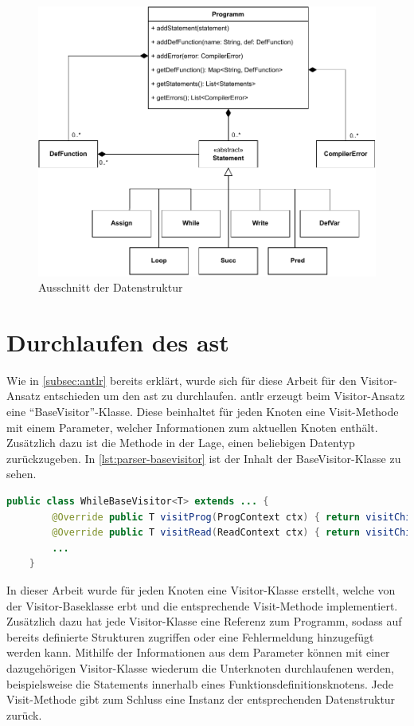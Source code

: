 \begin{figure}[h!]
	\centering
	\includegraphics[width=13cm]{content/pictures/ClassDia.pdf}
	\caption{Ausschnitt der Datenstruktur}
	\label{pic:Semantic-Struct}
\end{figure}

\section{Durchlaufen des \acl{ast}}
Wie in \cref{subsec:antlr} bereits erklärt, wurde sich für diese Arbeit für den Visitor-Ansatz entschieden um den \ac{ast} zu durchlaufen. \ac{antlr} erzeugt beim Visitor-Ansatz eine \enquote{BaseVisitor}-Klasse. Diese beinhaltet für jeden Knoten eine Visit-Methode mit einem Parameter, welcher Informationen zum aktuellen Knoten enthält. Zusätzlich dazu ist die Methode in der Lage, einen beliebigen Datentyp zurückzugeben. In \cref{lst:parser-basevisitor} ist der Inhalt der BaseVisitor-Klasse zu sehen.

\begin{lstlisting}[language=java, caption=Inhalt der generierten BaseVisitor-Klasse, label={lst:parser-basevisitor}]
	public class WhileBaseVisitor<T> extends ... {
		@Override public T visitProg(ProgContext ctx) { return visitChildren(ctx); }
		@Override public T visitRead(ReadContext ctx) { return visitChildren(ctx); }
		...
	}
\end{lstlisting}

In dieser Arbeit wurde für jeden Knoten eine Visitor-Klasse erstellt, welche von der Visitor-Baseklasse erbt und die entsprechende Visit-Methode implementiert. Zusätzlich dazu hat jede Visitor-Klasse eine Referenz zum Programm, sodass auf bereits definierte Strukturen zugriffen oder eine Fehlermeldung hinzugefügt werden kann. Mithilfe der Informationen aus dem Parameter können mit einer dazugehörigen Visitor-Klasse wiederum die Unterknoten durchlaufenen werden, beispielsweise die Statements innerhalb eines Funktionsdefinitionsknotens. Jede Visit-Methode gibt zum Schluss eine Instanz der entsprechenden Datenstruktur zurück.


